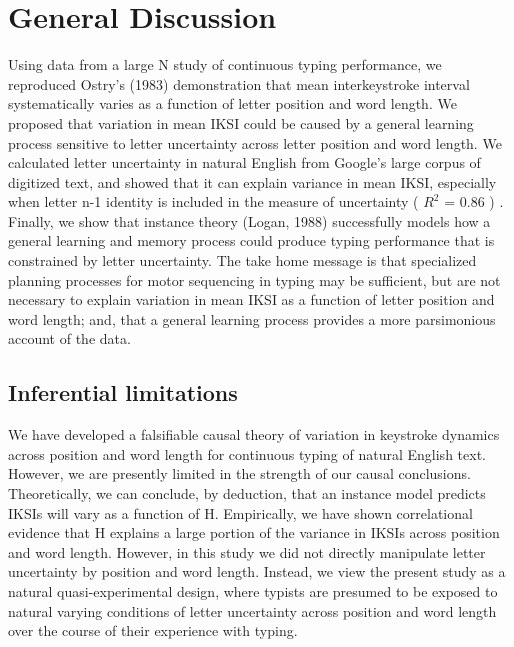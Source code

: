 \documentclass[,man,donotrepeattitle,floatsintext]{apa6}
\begin{document}
\hypertarget{general-discussion}{%
\section{General Discussion}\label{general-discussion}}

Using data from a large N study of continuous typing performance, we reproduced Ostry's (1983) demonstration that mean interkeystroke interval systematically varies as a function of letter position and word length. We proposed that variation in mean IKSI could be caused by a general learning process sensitive to letter uncertainty across letter position and word length. We calculated letter uncertainty in natural English from Google's large corpus of digitized text, and showed that it can explain variance in mean IKSI, especially when letter n-1 identity is included in the measure of uncertainty ( \(R^2\) = 0.86 ) . Finally, we show that instance theory (Logan, 1988) successfully models how a general learning and memory process could produce typing performance that is constrained by letter uncertainty. The take home message is that specialized planning processes for motor sequencing in typing may be sufficient, but are not necessary to explain variation in mean IKSI as a function of letter position and word length; and, that a general learning process provides a more parsimonious account of the data.

\hypertarget{inferential-limitations}{%
\subsection{Inferential limitations}\label{inferential-limitations}}

We have developed a falsifiable causal theory of variation in keystroke dynamics across position and word length for continuous typing of natural English text. However, we are presently limited in the strength of our causal conclusions. Theoretically, we can conclude, by deduction, that an instance model predicts IKSIs will vary as a function of H. Empirically, we have shown correlational evidence that H explains a large portion of the variance in IKSIs across position and word length. However, in this study we did not directly manipulate letter uncertainty by position and word length. Instead, we view the present study as a natural quasi-experimental design, where typists are presumed to be exposed to natural varying conditions of letter uncertainty across position and word length over the course of their experience with typing.
\end{document}
